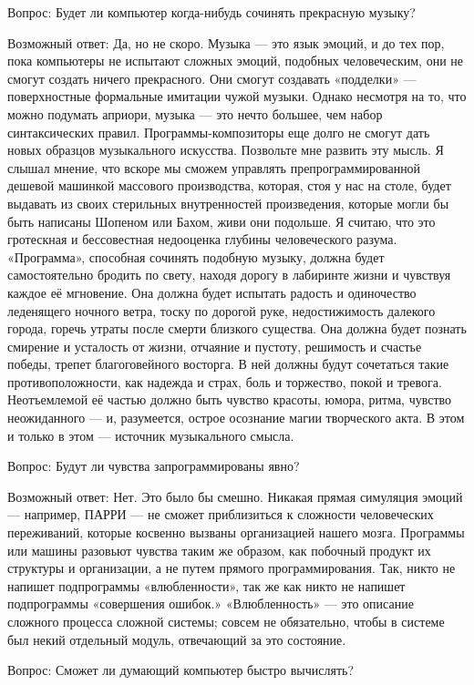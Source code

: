\documentclass[../main.tex]{subfiles}
\begin{document}
Вопрос: Будет ли компьютер когда-нибудь сочинять прекрасную музыку?

Возможный ответ: Да, но не скоро. Музыка --- это язык эмоций, и до тех пор, пока компьютеры не испытают сложных эмоций, подобных человеческим, они не смогут создать ничего прекрасного. Они смогут создавать «подделки» --- поверхностные формальные имитации чужой музыки. Однако несмотря на то, что можно подумать априори, музыка --- это нечто большее, чем набор синтаксических правил. Программы-композиторы еще долго не смогут дать новых образцов музыкального искусства. Позвольте мне развить эту мысль. Я слышал мнение, что вскоре мы сможем управлять препрограммированной дешевой машинкой массового производства, которая, стоя у нас на столе, будет выдавать из своих стерильных внутренностей произведения, которые могли бы быть написаны Шопеном или Бахом, живи они подольше. Я считаю, что это гротескная и бессовестная недооценка глубины человеческого разума. «Программа», способная сочинять подобную музыку, должна будет самостоятельно бродить по свету, находя дорогу в лабиринте жизни и чувствуя каждое её мгновение. Она должна будет испытать радость и одиночество леденящего ночного ветра, тоску по дорогой руке, недостижимость далекого города, горечь утраты после смерти близкого существа. Она должна будет познать смирение и усталость от жизни, отчаяние и пустоту, решимость и счастье победы, трепет благоговейного восторга. В ней должны будут сочетаться такие противоположности, как надежда и страх, боль и торжество, покой и тревога. Неотъемлемой её частью должно быть чувство красоты, юмора, ритма, чувство неожиданного --- и, разумеется, острое осознание магии творческого акта. В этом и только в этом --- источник музыкального смысла.

Вопрос: Будут ли чувства запрограммированы явно?

Возможный ответ: Нет. Это было бы смешно. Никакая прямая симуляция эмоций --- например, ПАРРИ --- не сможет приблизиться к сложности человеческих переживаний, которые косвенно вызваны организацией нашего мозга. Программы или машины разовьют чувства таким же образом, как побочный продукт их структуры и организации, а не путем прямого программирования. Так, никто не напишет подпрограммы «влюбленности», так же как никто не напишет подпрограммы «совершения ошибок.» «Влюбленность» --- это описание сложного процесса сложной системы; совсем не обязательно, чтобы в системе был некий отдельный модуль, отвечающий за это состояние.

Вопрос: Сможет ли думающий компьютер быстро вычислять?
\end{document}
